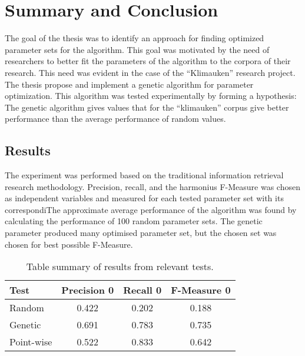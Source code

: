 \chapter{Summary and Conclusion} %
\label{Conclusion} %
The goal of the thesis was to identify an approach for finding optimized parameter sets for the \CTC algorithm. This goal was motivated by the need of researchers to better fit the parameters of the \CTC algorithm to the corpora of their research. This need was evident in the case of the ``Klimauken'' research project. The thesis propose and implement a genetic algorithm for parameter optimization. This algorithm was tested experimentally by forming a hypothesis: The genetic algorithm gives values that for the ``klimauken'' corpus give better performance than the average performance of random values.

\section{Results}
The experiment was performed based on the traditional information retrieval research methodology. Precision, recall, and the harmonius F-Measure was chosen as independent variables and measured for each tested parameter set with its correspondiThe approximate average performance of the algorithm was found by calculating the performance of 100 random parameter sets. The genetic parameter produced many optimised parameter set, but the chosen set was chosen for best possible F-Measure.

\begin{table}[H]
\begin{center}
\begin{tabular}{|l|ccc|}
\hline
Test & Precision 0 & Recall 0 & F-Measure 0\\ 
\hline
Random 						&   0.422& 	  0.202& 	0.188\\ 
Genetic 					&   0.691&    0.783&    0.735\\ 
Point-wise 					&   0.522&    0.833&    0.642\\ 
\hline
\end{tabular}
\end{center}
\caption{Table summary of results from relevant tests.}
\label{tab:summarytableresultsconclusion}
\end{table}

